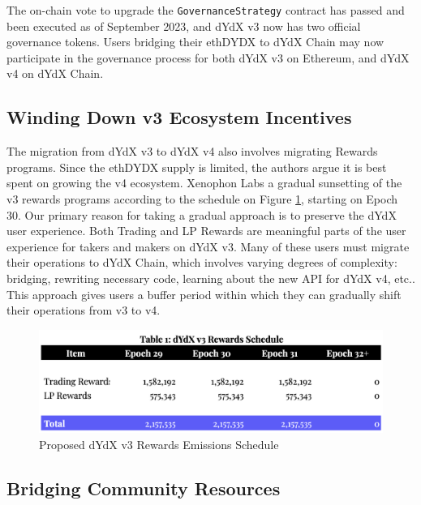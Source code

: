         The on-chain vote to upgrade the \texttt{GovernanceStrategy} contract has passed and been executed as of September 2023, and dYdX v3 now has two official governance tokens. Users bridging their ethDYDX to dYdX Chain may now participate in the governance process for both dYdX v3 on Ethereum, and dYdX v4 on dYdX Chain.

    \subsection{Winding Down v3 Ecosystem Incentives}

        The migration from dYdX v3 to dYdX v4 also involves migrating Rewards programs. Since the ethDYDX supply is limited, the authors argue it is best spent on growing the v4 ecosystem. Xenophon Labs  a gradual sunsetting of the v3 rewards programs according to the schedule on Figure \ref{fig:winddown}, starting on Epoch 30. Our primary reason for taking a gradual approach is to preserve the dYdX user experience. Both Trading and LP Rewards are meaningful parts of the user experience for takers and makers on dYdX v3. Many of these users must migrate their operations to dYdX Chain, which involves varying degrees of complexity: bridging, rewriting necessary code, learning about the new API for dYdX v4, etc.. This approach gives users a buffer period within which they can gradually shift their operations from v3 to v4.

        \begin{figure}[htp]
            \centering
            \includegraphics[width=\linewidth]{figs/reduction.png}
            \caption{Proposed dYdX v3 Rewards Emissions Schedule}
            \label{fig:winddown}
        \end{figure}
    
    \subsection{Bridging Community Resources}

